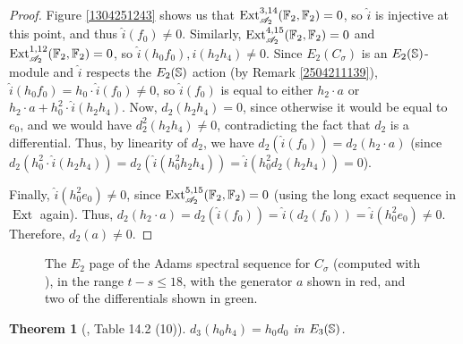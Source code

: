 \documentclass[11pt, titlepage]{article} %
\def\bb{\ensuremath\mathbb}
\def\A{\ensuremath{\mathscr{A}_2}}
\DeclareMathOperator{\Ext}{Ext}
\numberwithin{equation}{subsection}
\theoremstyle{plain}
\newtheorem{theorem}{Theorem}[subsection]
\theoremstyle{definition}
\begin{document}
\begin{proof}
Figure \ref{1304251243} shows us that \(\Ext_{\A}^{3,14}(\bb{F}_2, \bb{F}_2)=0\), so \(\hat i\) is injective at this point, and thus \(\hat i(f_0)\neq 0\). Similarly, \(\Ext_{\A}^{4,15}(\bb{F}_2, \bb{F}_2)=0\) and \(\Ext_{\A}^{1,12}(\bb{F}_2, \bb{F}_2)=0\), so \(\hat i(h_0f_0), \hat i(h_2h_4)\neq 0\). Since \(E_2(C_\sigma)\) is an \(E_2(\bb{S})\)-module and \(\hat i\) respects the \(E_2(\bb{S})\) action (by Remark \ref{2504211139}), \(\hat i(h_0f_0)=h_0\cdot\hat i(f_0)\neq 0\), so \(\hat i(f_0)\) is equal to either \(h_2\cdot a\) or \(h_2\cdot a+h_0^2\cdot\hat{i}(h_2h_4)\). Now, \(d_2(h_2h_4)=0\), since otherwise it would be equal to \(e_0\), and we would have \(d_2^2(h_2h_4)\neq 0\), contradicting the fact that \(d_2\) is a differential. Thus, by linearity of \(d_2\), we have \(d_2(\hat i(f_0))=d_2(h_2\cdot a)\) (since \(d_2(h_0^2\cdot\hat i (h_2h_4))=d_2(\hat i(h_0^2h_2h_4))=\hat i(h_0^2d_2(h_2h_4))=0\)).

Finally, \(\hat i(h_0^2e_0)\neq 0\), since \(\Ext_{\A}^{5,15}(\bb{F}_2, \bb{F}_2)=0\) (using the long exact sequence in \(\Ext\) again). Thus, \(d_2(h_2\cdot a)=
d_2(\hat i(f_0))=\hat i(d_2(f_0))=\hat i(h_0^2e_0)\neq 0\). Therefore, \(d_2(a)\neq 0\).
\end{proof}

\begin{figure}
\centering

\caption{The \(E_2\) page of the Adams spectral sequence for \(C_\sigma\) (computed with \autocite{sseq}), in the range \(t-s\leq 18\), with the generator \(a\) shown in red, and two of the differentials shown in green.}
\label{2504131812}
\end{figure}

\begin{theorem}[{\autocite{rognes2}, Table 14.2 (10)}]
\(d_3(h_0h_4)=h_0d_0\) in \(E_3(\bb{S})\).
\end{theorem}
\end{document}
